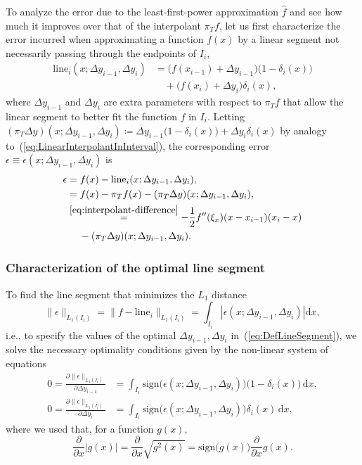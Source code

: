\documentclass[a4paper,english]{IEEEtran}
\begin{document}
To analyze the error due to the least-first-power approximation ${\hat{f}}$
and see how much it improves over that of the interpolant ${\pi_{T}} f$,
let us first characterize the error incurred when approximating a
function ${f}(x)$ by a linear segment not necessarily passing through
the endpoints of $I_{i}$,
\begin{align}
{\mathrm{line}_{i}}(x;\Delta y_{i-1},\Delta y_{i}) & =\bigl({f}(x_{i-1})+\Delta y_{i-1}\bigr)\bigl(1-\delta_{i}(x)\bigr)\nonumber \\
 & \quad+\bigl({f}(x_{i})+\Delta y_{i}\bigr)\delta_{i}(x),\label{eq:DefLineSegment}
\end{align}
where $\Delta y_{i-1}$ and $\Delta y_{i}$ are extra parameters with
respect to ${\pi_{T}}{f}$ that allow the linear segment to better fit the
function ${f}$ in $I_{i}$. Letting $({\pi_{T}}\Delta y)(x;\Delta y_{i-1},\Delta y_{i})\coloneqq\Delta y_{i-1}\bigl(1-\delta_{i}(x)\bigr)+\Delta y_{i}\delta_{i}(x)$
by analogy to~(\ref{eq:LinearInterpolantInInterval}), the corresponding
error $\epsilon\equiv\epsilon(x;\Delta y_{i-1},\Delta y_{i})$ is
\begin{align}
\epsilon & ={f}(x)-{\mathrm{line}_{i}}(x;\Delta y_{i-1},\Delta y_{i}),\label{eq:DefEpsilonLineSegment}\\
 & ={f}(x)-{\pi_{T}}{f}(x)-({\pi_{T}}\Delta y)(x;\Delta y_{i-1},\Delta y_{i}),\nonumber \\
 & \stackrel{\eqref{eq:interpolant-difference}}{=}-\frac{1}{2}{{f}^{\prime\prime}}(\xi_{x})(x-x_{i-1})(x_{i}-x)\nonumber \\
 & \quad\;-({\pi_{T}}\Delta y)(x;\Delta y_{i-1},\Delta y_{i}).\label{eq:EpsilonSimplified}
\end{align}
 

\subsubsection{Characterization of the optimal line segment}

To find the line segment that minimizes the ${L_{1}}$ distance
\[
\|\epsilon\|_{{L_{1}}(I_{i})}=\|{f}-{\mathrm{line}_{i}}\|_{{L_{1}}(I_{i})}=\int_{I_{i}}\left|\epsilon(x;\Delta y_{i-1},\Delta y_{i})\right|{\mathrm{d}} x,
\]
i.e., to specify the values of the optimal $\Delta y_{i-1},\Delta y_{i}$
in~(\ref{eq:DefLineSegment}), we solve the necessary optimality
conditions given by the non-linear system of equations
\begin{equation}
\begin{aligned}0=\frac{\partial\|\epsilon\|_{{L_{1}}(I_{i})}}{\partial\Delta y_{i-1}} & =\int_{I_{i}}{\text{sign}}\bigl(\epsilon(x;\Delta y_{i-1},\Delta y_{i})\bigr)\bigl(1-\delta_{i}(x)\bigr)\,{\mathrm{d}} x,\\
0=\frac{\partial\|\epsilon\|_{{L_{1}}(I_{i})}}{\partial\Delta y_{i}} & =\int_{I_{i}}{\text{sign}}\bigl(\epsilon(x;\Delta y_{i-1},\Delta y_{i})\bigr)\delta_{i}(x)\,{\mathrm{d}} x,
\end{aligned}
\label{eq:OptConditionsBestSegmentL1}
\end{equation}
where we used that, for a function $g(x)$,
\[
\frac{\partial}{\partial x}|g(x)|=\frac{\partial}{\partial x}\sqrt{g^{2}(x)}={\text{sign}}\bigl(g(x)\bigr)\frac{\partial}{\partial x}g(x).
\]
\end{document}
